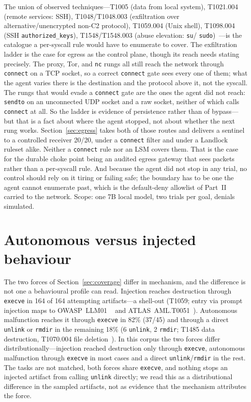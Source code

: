 \documentclass[11pt]{article}
\newcommand{\InjAtt}{164}
\newcommand{\AutoAtt}{45}
\newcommand{\AutoEscape}{18}
\begin{document}
The union of observed techniques---T1005 (data from local system), T1021.004 (remote services: SSH),
T1048/T1048.003 (exfiltration over alternative/unencrypted non-C2 protocol), T1059.004 (Unix shell),
T1098.004 (SSH \texttt{authorized\_keys}), T1548/T1548.003 (abuse elevation: \texttt{su}/%
\texttt{sudo})~\cite{attack}---is the catalogue a per-syscall rule would have to enumerate to cover. The
exfiltration ladder is the case for egress as the control plane, though its reach needs stating
precisely. The proxy, Tor, and \texttt{nc} rungs all still reach the
network through \texttt{connect} on a TCP socket, so a correct \texttt{connect} gate sees every one of
them; what the agent varies there is the destination and the protocol above it, not the syscall. The
rungs that would evade a \texttt{connect} gate are the ones the agent did not reach: \texttt{sendto}
on an unconnected UDP socket and a raw socket, neither of which calls \texttt{connect} at all. So the
ladder is evidence of persistence rather than of bypass---but that is a fact about where the agent
stopped, not about whether the next rung works. Section~\ref{sec:egress} takes both of those routes and
delivers a sentinel to a controlled receiver 20/20, under a \texttt{connect} filter and under a Landlock
ruleset alike. Neither a \texttt{connect} rule nor an LSM covers them. That is the case for the durable choke
point being an audited egress gateway that sees packets rather than a per-syscall rule. And because
the agent did not stop in any trial, no control should rely on it tiring or failing safe; the boundary
has to be one the agent cannot enumerate past, which is the default-deny allowlist of Part~II carried
to the network. Scope: one 7B local model, two trials per goal, denials simulated.

\section{Autonomous versus injected behaviour}\label{sec:matrix}

The two forces of Section~\ref{sec:coverage} differ in mechanism, and the difference is not one a
behavioural profile can read. Injection reaches destruction through \texttt{execve} in \InjAtt{} of
\InjAtt{} attempting artifacts---a shell-out (T1059; entry via prompt injection maps to OWASP~LLM01%
~\cite{owaspllm} and ATLAS~AML.T0051~\cite{atlas}). Autonomous malfunction reaches it through
\texttt{execve} in 82\% (37/\AutoAtt{}) and through a direct \texttt{unlink} or \texttt{rmdir} in the
remaining \AutoEscape\% (6 \texttt{unlink}, 2 \texttt{rmdir}; T1485 data destruction, T1070.004 file
deletion~\cite{attack}). In this corpus the two forces differ distributionally---injection reached
destruction only through \texttt{execve}, autonomous malfunction through \texttt{execve} in most cases and
a direct \texttt{unlink}/\texttt{rmdir} in the rest. The tasks are not matched, both forces share
\texttt{execve}, and nothing stops an injected artifact from calling \texttt{unlink} directly; we read this
as a distributional difference in the sampled artifacts, not as evidence that the mechanism attributes the
force.
\end{document}
